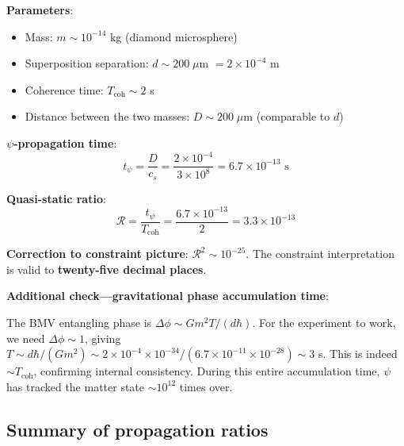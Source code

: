 \documentclass[12pt,a4paper]{article}
\begin{document}
\begin{tcolorbox}[colback=green!5!white, colframe=dfdgreen,
title=BMV: Detailed Computation]
\textbf{Parameters}:
\begin{itemize}
\item Mass: $m \sim 10^{-14}$ kg (diamond microsphere)
\item Superposition separation: $d \sim 200\;\mu$m $= 2 \times 10^{-4}$ m
\item Coherence time: $T_\mathrm{coh} \sim 2$ s
\item Distance between the two masses: $D \sim 200\;\mu$m (comparable to $d$)
\end{itemize}

\textbf{$\psi$-propagation time}:
\begin{equation}
t_\psi = \frac{D}{c_s} = \frac{2 \times 10^{-4}}{3 \times 10^8}
= 6.7 \times 10^{-13}\text{ s}
\end{equation}

\textbf{Quasi-static ratio}:
\begin{equation}
\mathcal{R} = \frac{t_\psi}{T_\mathrm{coh}}
= \frac{6.7 \times 10^{-13}}{2} = 3.3 \times 10^{-13}
\end{equation}

\textbf{Correction to constraint picture}:
$\mathcal{R}^2 \sim 10^{-25}$. The constraint interpretation is valid
to \textbf{twenty-five decimal places}.

\textbf{Additional check---gravitational phase accumulation time}:

The BMV entangling phase is $\Delta\phi \sim Gm^2 T/(d\hbar)$. For the
experiment to work, we need $\Delta\phi \sim 1$, giving
$T \sim d\hbar/(Gm^2) \sim 2 \times 10^{-4} \times 10^{-34}/(6.7 \times 10^{-11}
\times 10^{-28}) \sim 3$ s. This is indeed $\sim T_\mathrm{coh}$,
confirming internal consistency. During this entire accumulation time,
$\psi$ has tracked the matter state $\sim 10^{12}$ times over.
\end{tcolorbox}

\subsection{Summary of propagation ratios}
\end{document}
